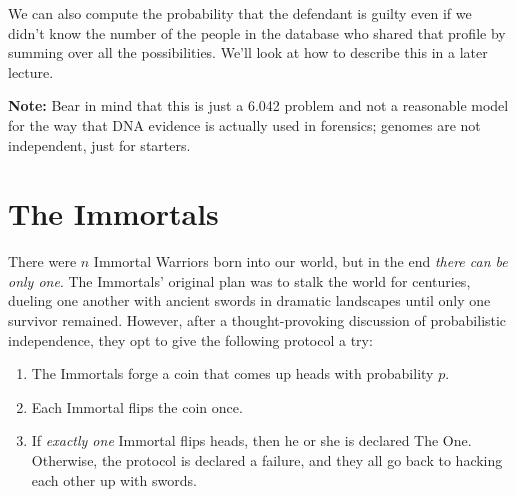 \documentclass[12pt]{article}
\begin{document}
\begin{itemize}
{We can also compute the probability that the defendant is guilty even if we didn't know the number of the people in the database who shared that profile by summing over all the possibilities. We'll look at how to describe this in a later lecture.

\textbf{Note:} Bear in mind that this is just a 6.042 problem and not a reasonable model for the way that DNA evidence is actually used in forensics; genomes are not independent, just for starters.}

\end{itemize}


\section{The Immortals}
There were $n$ Immortal Warriors born into our world, but in the end
{\em there can be only one}.  The Immortals' original plan was to
stalk the world for centuries, dueling one another with ancient swords
in dramatic landscapes until only one survivor remained.  However,
after a thought-provoking discussion of probabilistic independence,
they opt to give the following protocol a try:

\begin{enumerate}

\item The Immortals forge a coin that comes up heads with probability
$p$.

\item Each Immortal flips the coin once.

\item If {\em exactly one} Immortal flips heads, then he or she is
declared The One.  Otherwise, the protocol is declared a failure, and
they all go back to hacking each other up with swords.

\end{enumerate}
\end{document}
